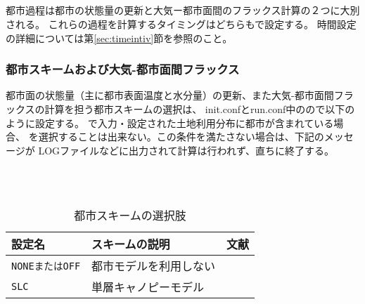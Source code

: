 \subsection{\SubsecUrbanSetting} \label{subsec:basic_usel_urban}
都市過程は都市の状態量の更新と大気ー都市面間のフラックス計算の２つに大別される。
これらの過程を計算するタイミングはどちらもで設定する。
時間設定の詳細については第\ref{sec:timeintiv}節を参照のこと。\\

\subsubsection{都市スキームおよび大気-都市面間フラックス}
都市面の状態量（主に都市表面温度と水分量）の更新、また大気-都市面間フラックスの計算を担う都市スキームの選択は、
init.confとrun.conf中のので以下のように設定する。
で入力・設定された土地利用分布に都市が含まれている場合、
を選択することは出来ない。この条件を満たさない場合は、下記のメッセージが
LOGファイルなどに出力されて計算は行われず、直ちに終了する。

\\

\\

\begin{table}[h]
\begin{center}
  \caption{都市スキームの選択肢}
  \label{tab:nml_urban}
  \begin{tabularx}{150mm}{llX} \hline
    \rowcolor[gray]{0.9}  設定名 & スキームの説明 & 文献 \\ \hline
      \verb|NONEまたはOFF| & 都市モデルを利用しない                      \\
      \verb|SLC|          & 単層キャノピーモデル  & \citet{kusaka_2001} \\
    \hline
  \end{tabularx}
\end{center}
\end{table}
